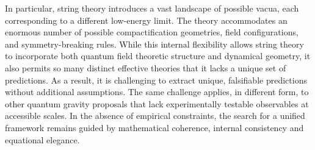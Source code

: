 In particular, string theory introduces a vast landscape of possible vacua, each corresponding to a different low-energy limit. The theory accommodates an enormous number of possible compactification geometries, field configurations, and symmetry-breaking rules. While this internal flexibility allows string theory to incorporate both quantum field theoretic structure and dynamical geometry, it also permits so many distinct effective theories that it lacks a unique set of predictions. As a result, it is challenging to extract unique, falsifiable predictions without additional assumptions. The same challenge applies, in different form, to other quantum gravity proposals that lack experimentally testable observables at accessible scales. In the absence of empirical constraints, the search for a unified framework remains guided by mathematical coherence, internal consistency and equational elegance.



